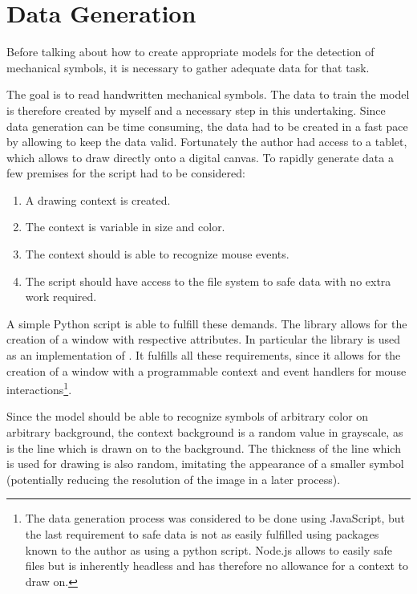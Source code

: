 \section{Data Generation}

Before talking about how to create appropriate models for the detection of
mechanical symbols, it is necessary to gather adequate data for that task.

The goal is to read handwritten mechanical symbols.
The data to train the model is therefore created by myself and a necessary step in this undertaking.
Since data generation can be time consuming, the data had to be created in a fast pace by allowing to keep the data valid.
Fortunately the author had access to a tablet, which allows to draw directly onto a digital canvas.
To rapidly generate data a few premises for the script had to be considered:
\begin{enumerate}
    \item A drawing context is created.
    \item The context is variable in size and color.
    \item The context should is able to recognize mouse events.
    \item The script should have access to the file system to safe data with no extra work required.
\end{enumerate}

A simple Python script is able to fulfill these demands.
The library  \cite{OpenCV2019} allows for the creation of a window with respective attributes. In particular the library  \cite{Heinisuo2019} is used as an implementation of .
It fulfills all these requirements, since it allows for the creation of a window with a programmable context and event handlers for mouse interactions\footnote{ The data generation process was considered to be done using JavaScript, but the last requirement to safe data is not as easily fulfilled using packages known to the author as using a python script. Node.js allows to easily safe files but is inherently headless and has therefore no allowance for a context to draw on. }.

Since the model should be able to recognize symbols of arbitrary color on arbitrary background, the context background is a random value in grayscale, as is the line which is drawn on to the background.
The thickness of the line which is used for drawing is also random, imitating the appearance of a smaller symbol (potentially reducing the resolution of the image in a later process).

